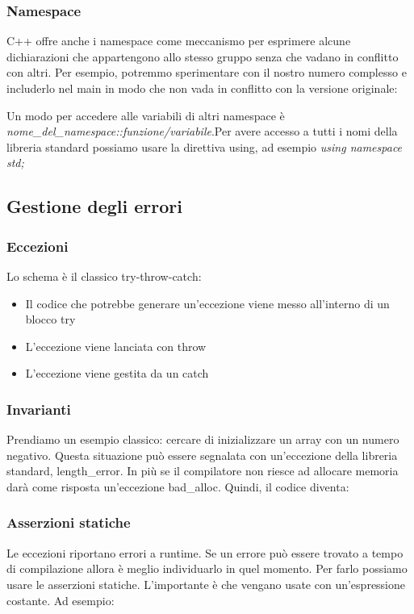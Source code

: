 \documentclass[11pt,a4paper]{book}
\begin{document}
\subsubsection{Namespace}
C++ offre anche i namespace come meccanismo per esprimere alcune dichiarazioni che appartengono allo stesso gruppo senza che vadano in conflitto con altri. Per esempio, potremmo sperimentare con il nostro numero complesso e includerlo nel main in modo che non vada in conflitto con la versione originale:
\label{code: 020}

Un modo per accedere alle variabili di altri namespace è \emph{nome\_del\_namespace::funzione/variabile}.Per avere accesso a tutti i nomi della libreria standard possiamo usare la direttiva using, ad esempio \emph{using namespace std;}

\subsection{Gestione degli errori}
\subsubsection{Eccezioni}
Lo schema è il classico try-throw-catch:
\begin{itemize}
	\item Il codice che potrebbe generare un'eccezione viene messo all'interno di un blocco try
	\item L'eccezione viene lanciata con throw
	\item L'eccezione viene gestita da un catch
\end{itemize}

\label{code: 021}

\subsubsection{Invarianti}
Prendiamo un esempio classico: cercare di inizializzare un array con un numero negativo. Questa situazione può essere segnalata con un'eccezione della libreria standard, length\_error. In più se il compilatore non riesce ad allocare memoria darà come risposta un'eccezione bad\_alloc. Quindi, il codice diventa:
\label{code: 022}

\subsubsection{Asserzioni statiche}
Le eccezioni riportano errori a runtime. Se un errore può essere trovato a tempo di compilazione allora è meglio individuarlo in quel momento. Per farlo possiamo usare le asserzioni statiche. L'importante è che vengano usate con un'espressione costante. Ad esempio:
\label{code: 023}
\end{document}

